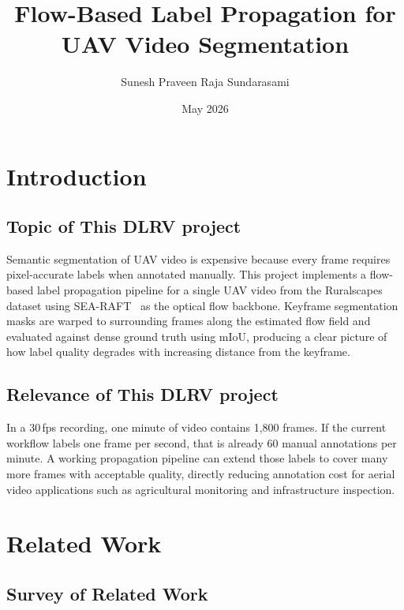 \documentclass[rnd]{mas_proposal}
\title{Flow-Based Label Propagation for UAV Video Segmentation}
\author{Sunesh Praveen Raja Sundarasami}
\date{May 2026}
\begin{document}
\maketitle

\pagestyle{plain}

\section{Introduction}

\subsection{Topic of This DLRV project}

Semantic segmentation of UAV video is expensive because every frame requires
pixel-accurate labels when annotated manually. This project implements a
flow-based label propagation pipeline for a single UAV video from the
Ruralscapes dataset using SEA-RAFT~\cite{searaft2024} as the optical flow
backbone. Keyframe segmentation masks are warped to surrounding frames along
the estimated flow field and evaluated against dense ground truth using mIoU,
producing a clear picture of how label quality degrades with increasing
distance from the keyframe.

\subsection{Relevance of This DLRV project}

In a 30\,fps recording, one minute of video contains 1,800 frames. If the
current workflow labels one frame per second, that is already 60 manual
annotations per minute. A working propagation pipeline can extend those labels
to cover many more frames with acceptable quality, directly reducing annotation
cost for aerial video applications such as agricultural monitoring and
infrastructure inspection.

\section{Related Work}

\subsection{Survey of Related Work}
\end{document}
